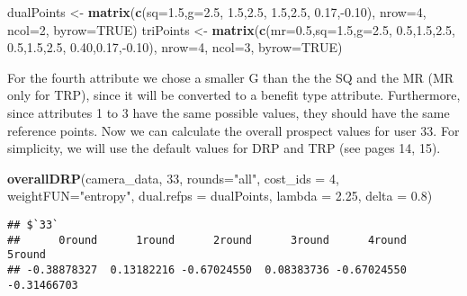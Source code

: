 \documentclass[]{article}
\newenvironment{Shaded}{\begin{snugshade}}{\end{snugshade}}
\newcommand{\KeywordTok}[1]{\textcolor[rgb]{0.13,0.29,0.53}{\textbf{{#1}}}}
\newcommand{\DataTypeTok}[1]{\textcolor[rgb]{0.13,0.29,0.53}{{#1}}}
\newcommand{\DecValTok}[1]{\textcolor[rgb]{0.00,0.00,0.81}{{#1}}}
\newcommand{\FloatTok}[1]{\textcolor[rgb]{0.00,0.00,0.81}{{#1}}}
\newcommand{\StringTok}[1]{\textcolor[rgb]{0.31,0.60,0.02}{{#1}}}
\newcommand{\OtherTok}[1]{\textcolor[rgb]{0.56,0.35,0.01}{{#1}}}
\newcommand{\NormalTok}[1]{{#1}}
\begin{document}
\begin{Shaded}
\begin{Highlighting}[]
\NormalTok{dualPoints <-}\StringTok{ }\KeywordTok{matrix}\NormalTok{(}\KeywordTok{c}\NormalTok{(}\DataTypeTok{sq=}\FloatTok{1.5}\NormalTok{,}\DataTypeTok{g=}\FloatTok{2.5}\NormalTok{,  }\FloatTok{1.5}\NormalTok{,}\FloatTok{2.5}\NormalTok{,  }\FloatTok{1.5}\NormalTok{,}\FloatTok{2.5}\NormalTok{,  }\FloatTok{0.17}\NormalTok{,-}\FloatTok{0.10}\NormalTok{),}
                     \DataTypeTok{nrow=}\DecValTok{4}\NormalTok{, }\DataTypeTok{ncol=}\DecValTok{2}\NormalTok{, }\DataTypeTok{byrow=}\OtherTok{TRUE}\NormalTok{)}
\NormalTok{triPoints <-}\StringTok{  }\KeywordTok{matrix}\NormalTok{(}\KeywordTok{c}\NormalTok{(}\DataTypeTok{mr=}\FloatTok{0.5}\NormalTok{,}\DataTypeTok{sq=}\FloatTok{1.5}\NormalTok{,}\DataTypeTok{g=}\FloatTok{2.5}\NormalTok{,  }\FloatTok{0.5}\NormalTok{,}\FloatTok{1.5}\NormalTok{,}\FloatTok{2.5}\NormalTok{,  }\FloatTok{0.5}\NormalTok{,}\FloatTok{1.5}\NormalTok{,}\FloatTok{2.5}\NormalTok{,  }
                       \FloatTok{0.40}\NormalTok{,}\FloatTok{0.17}\NormalTok{,-}\FloatTok{0.10}\NormalTok{), }\DataTypeTok{nrow=}\DecValTok{4}\NormalTok{, }\DataTypeTok{ncol=}\DecValTok{3}\NormalTok{, }\DataTypeTok{byrow=}\OtherTok{TRUE}\NormalTok{)}
\end{Highlighting}
\end{Shaded}

For the fourth attribute we chose a smaller G than the the SQ and the MR
(MR only for TRP), since it will be converted to a benefit type
attribute. Furthermore, since attributes 1 to 3 have the same possible
values, they should have the same reference points. Now we can calculate
the overall prospect values for user 33. For simplicity, we will use the
default values for DRP and TRP (see pages 14, 15).

\begin{Shaded}
\begin{Highlighting}[]
\KeywordTok{overallDRP}\NormalTok{(camera_data, }\DecValTok{33}\NormalTok{, }\DataTypeTok{rounds=}\StringTok{"all"}\NormalTok{, }\DataTypeTok{cost_ids =} \DecValTok{4}\NormalTok{, }\DataTypeTok{weightFUN=}\StringTok{"entropy"}\NormalTok{,}
           \DataTypeTok{dual.refps =} \NormalTok{dualPoints, }\DataTypeTok{lambda =} \FloatTok{2.25}\NormalTok{, }\DataTypeTok{delta =} \FloatTok{0.8}\NormalTok{)}
\end{Highlighting}
\end{Shaded}

\begin{verbatim}
## $`33`
##      0round      1round      2round      3round      4round      5round 
## -0.38878327  0.13182216 -0.67024550  0.08383736 -0.67024550 -0.31466703
\end{verbatim}
\end{document}
